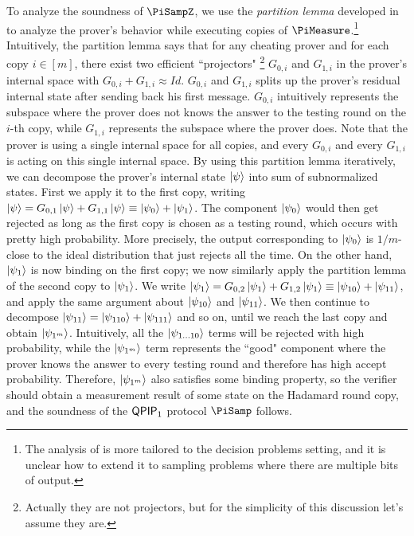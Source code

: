 
To analyze the soundness of $\PiSampZ$, we use the \emph{partition lemma} developed in~\cite{arXiv:ChiaChungYam19} to analyze the prover's behavior while executing copies of $\PiMeasure$.\footnote{The analysis of \cite{arXiv:AlaChiHun19} is more tailored to the decision problems setting, and it is unclear how to extend it to sampling problems where there are multiple bits of output.} Intuitively, the partition lemma says that for any cheating prover and for each copy $i\in[m]$, there exist two efficient ``projectors" \footnote{Actually they are not projectors, but for the simplicity of this discussion let's assume they are.} $G_{0,i}$ and $G_{1,i}$ in the prover's internal space with $G_{0,i}+G_{1,i} \approx Id$. $G_{0,i}$ and $G_{1,i}$ splits up the prover's residual internal state after sending back his first message.
$G_{0,i}$ intuitively represents the subspace where the prover does not knows the answer to the testing round on the $i$-th copy, while $G_{1,i}$ represents the subspace where the prover does. Note that the prover is using a single internal space for all copies, and every $G_{0,i}$ and every $G_{1,i}$ is acting on this single internal space. 
By using this partition lemma iteratively, we can decompose the prover's internal state $\ket{\psi}$ into sum of subnormalized states.
First we apply it to the first copy, writing $\ket{\psi}=G_{0,1}\ket{\psi}+G_{1,1}\ket{\psi} \equiv \ket{\psi_0}+\ket{\psi_1}$.
The component $\ket{\psi_0}$ would then get rejected as long as the first copy is chosen as a testing round,
which occurs with pretty high probability.
More precisely, the output corresponding to $\ket{\psi_0}$ is $1/m$-close to the ideal distribution that just rejects all the time.
On the other hand, $\ket{\psi_1}$ is now binding on the first copy;
we now similarly apply the partition lemma of the second copy to $\ket{\psi_1}$.
We write $\ket{\psi_1}=G_{0,2}\ket{\psi_1}+G_{1,2}\ket{\psi_1}\equiv \ket{\psi_{10}}+\ket{\psi_{11}}$, and apply the same argument about $\ket{\psi_{10}}$ and $\ket{\psi_{11}}$.
We then continue to decompose $\ket{\psi_{11}}=\ket{\psi_{110}}+\ket{\psi_{111}}$ and so on, until we reach the last copy and obtain $\ket{\psi_{1^m}}$.
Intuitively, all the $\ket{\psi_{1\dots10}}$ terms will be rejected with high probability, while the $\ket{\psi_{1^m}}$ term represents the ``good" component where the prover knows the answer to every testing round and therefore has high accept probability. Therefore, $\ket{\psi_{1^m}}$ also satisfies some binding property,
so the verifier should obtain a measurement result of some state on the Hadamard round copy,
and the soundness of the $\operatorname{\mathsf{QPIP}}_1$ protocol $\PiSamp$ follows.

